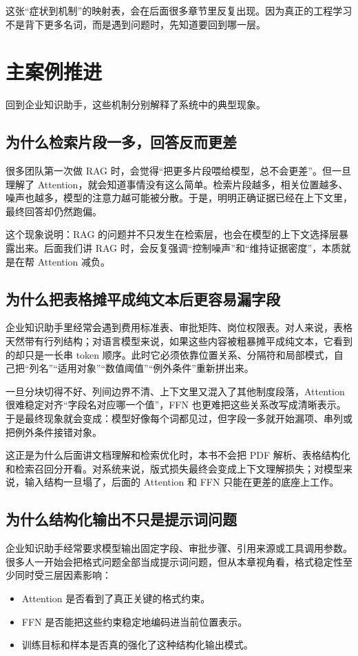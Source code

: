 这张“症状到机制”的映射表，会在后面很多章节里反复出现。因为真正的工程学习不是背下更多名词，而是遇到问题时，先知道要回到哪一层。

\section{主案例推进}
回到企业知识助手，这些机制分别解释了系统中的典型现象。

\subsection{为什么检索片段一多，回答反而更差}
很多团队第一次做 RAG 时，会觉得“把更多片段喂给模型，总不会更差”。但一旦理解了 Attention，就会知道事情没有这么简单。检索片段越多，相关位置越多、噪声也越多，模型的注意力越可能被分散。于是，明明正确证据已经在上下文里，最终回答却仍然跑偏。

这个现象说明：RAG 的问题并不只发生在检索层，也会在模型的上下文选择层暴露出来。后面我们讲 RAG 时，会反复强调“控制噪声”和“维持证据密度”，本质就是在帮 Attention 减负。

\subsection{为什么把表格摊平成纯文本后更容易漏字段}
企业知识助手里经常会遇到费用标准表、审批矩阵、岗位权限表。对人来说，表格天然带有行列结构；对语言模型来说，如果这些内容被粗暴摊平成纯文本，它看到的却只是一长串 token 顺序。此时它必须依靠位置关系、分隔符和局部模式，自己把“列名”“适用对象”“数值阈值”“例外条件”重新拼出来。

一旦分块切得不好、列间边界不清、上下文里又混入了其他制度段落，Attention 很难稳定对齐“字段名对应哪一个值”，FFN 也更难把这些关系改写成清晰表示。于是最终现象就会变成：模型好像每个词都见过，但字段一多就开始漏项、串列或把例外条件接错对象。

这正是为什么后面讲文档理解和检索优化时，本书不会把 PDF 解析、表格结构化和检索召回分开看。对系统来说，版式损失最终会变成上下文理解损失；对模型来说，输入结构一旦塌了，后面的 Attention 和 FFN 只能在更差的底座上工作。

\subsection{为什么结构化输出不只是提示词问题}
企业知识助手经常要求模型输出固定字段、审批步骤、引用来源或工具调用参数。很多人一开始会把格式问题全部当成提示词问题，但从本章视角看，格式稳定性至少同时受三层因素影响：
\begin{itemize}
  \item Attention 是否看到了真正关键的格式约束。
  \item FFN 是否能把这些约束稳定地编码进当前位置表示。
  \item 训练目标和样本是否真的强化了这种结构化输出模式。
\end{itemize}

